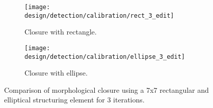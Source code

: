 \begin{figure}[H]
    \centering
    \begin{subfigure}[b]{0.45\textwidth}
        \texttt{[image: design/detection/calibration/rect\_3\_edit]}
        \caption{Closure with rectangle.}
    \end{subfigure}
    \begin{subfigure}[b]{0.45\textwidth}
        \texttt{[image: design/detection/calibration/ellipse\_3\_edit]}
        \caption{Closure with ellipse.}
    \end{subfigure}
    \captionsetup{format = hang}
    \caption{Comparison of morphological closure using a 7x7 rectangular and elliptical structuring element for 3 iterations.}
    \label{fig:compare_closure}
\end{figure}


